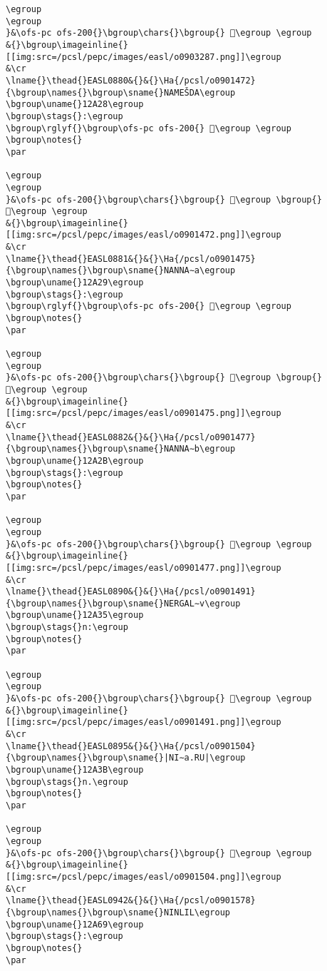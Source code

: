 \begin{verbatim}
\egroup
\egroup
}&\ofs-pc ofs-200{}\bgroup\chars{}\bgroup{} 𒸐\egroup \egroup
&{}\bgroup\imageinline{}[[img:src=/pcsl/pepc/images/easl/o0903287.png]]\egroup
&\cr
\lname{}\thead{}EASL0880&{}&{}\Ha{/pcsl/o0901472}{\bgroup\names{}\bgroup\sname{}NAMEŠDA\egroup
\bgroup\uname{}12A28\egroup
\bgroup\stags{}:\egroup
\bgroup\rglyf{}\bgroup\ofs-pc ofs-200{} 𒨨\egroup \egroup
\bgroup\notes{}
\par 

\egroup
\egroup
}&\ofs-pc ofs-200{}\bgroup\chars{}\bgroup{} 𒨧\egroup \bgroup{} 𒨨\egroup \egroup
&{}\bgroup\imageinline{}[[img:src=/pcsl/pepc/images/easl/o0901472.png]]\egroup
&\cr
\lname{}\thead{}EASL0881&{}&{}\Ha{/pcsl/o0901475}{\bgroup\names{}\bgroup\sname{}NANNA∼a\egroup
\bgroup\uname{}12A29\egroup
\bgroup\stags{}:\egroup
\bgroup\rglyf{}\bgroup\ofs-pc ofs-200{} 𒨩\egroup \egroup
\bgroup\notes{}
\par 

\egroup
\egroup
}&\ofs-pc ofs-200{}\bgroup\chars{}\bgroup{} 𒨩\egroup \bgroup{} 𒨪\egroup \egroup
&{}\bgroup\imageinline{}[[img:src=/pcsl/pepc/images/easl/o0901475.png]]\egroup
&\cr
\lname{}\thead{}EASL0882&{}&{}\Ha{/pcsl/o0901477}{\bgroup\names{}\bgroup\sname{}NANNA∼b\egroup
\bgroup\uname{}12A2B\egroup
\bgroup\stags{}:\egroup
\bgroup\notes{}
\par 

\egroup
\egroup
}&\ofs-pc ofs-200{}\bgroup\chars{}\bgroup{} 𒨫\egroup \egroup
&{}\bgroup\imageinline{}[[img:src=/pcsl/pepc/images/easl/o0901477.png]]\egroup
&\cr
\lname{}\thead{}EASL0890&{}&{}\Ha{/pcsl/o0901491}{\bgroup\names{}\bgroup\sname{}NERGAL∼v\egroup
\bgroup\uname{}12A35\egroup
\bgroup\stags{}n:\egroup
\bgroup\notes{}
\par 

\egroup
\egroup
}&\ofs-pc ofs-200{}\bgroup\chars{}\bgroup{} 𒨵\egroup \egroup
&{}\bgroup\imageinline{}[[img:src=/pcsl/pepc/images/easl/o0901491.png]]\egroup
&\cr
\lname{}\thead{}EASL0895&{}&{}\Ha{/pcsl/o0901504}{\bgroup\names{}\bgroup\sname{}|NI∼a.RU|\egroup
\bgroup\uname{}12A3B\egroup
\bgroup\stags{}n.\egroup
\bgroup\notes{}
\par 

\egroup
\egroup
}&\ofs-pc ofs-200{}\bgroup\chars{}\bgroup{} 𒨻\egroup \egroup
&{}\bgroup\imageinline{}[[img:src=/pcsl/pepc/images/easl/o0901504.png]]\egroup
&\cr
\lname{}\thead{}EASL0942&{}&{}\Ha{/pcsl/o0901578}{\bgroup\names{}\bgroup\sname{}NINLIL\egroup
\bgroup\uname{}12A69\egroup
\bgroup\stags{}:\egroup
\bgroup\notes{}
\par 


\end{verbatim}
